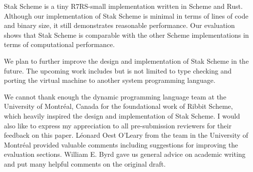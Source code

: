 \documentclass[sigplan]{acmart}
\begin{document}
Stak Scheme is a tiny R7RS-small implementation written in Scheme and
Rust.
Although our implementation of Stak Scheme is minimal in terms of
lines of code and binary size, it still demonstrates reasonable performance.
Our evaluation shows that Stak Scheme is
comparable with the other Scheme implementations in terms of
computational performance.

We plan to further improve the design and implementation of Stak
Scheme in the future. The upcoming work includes but is not limited
to type checking and porting the virtual machine to
another system programming language.

\begin{acks}
  We cannot thank enough the dynamic programming language team at the
  University of Montréal, Canada for the foundational work of Ribbit
  Scheme, which heavily inspired the design and implementation of
  Stak Scheme.
  I would also like to express my appreciation to all pre-submission
  reviewers for their feedback on this paper.
  Léonard Oest O'Leary from the team in the University of Montréal provided
  valuable comments including suggestions for improving the
  evaluation sections.
  William E. Byrd gave us general advice on academic writing and put
  many helpful comments on the original draft.
\end{acks}



\end{document}

